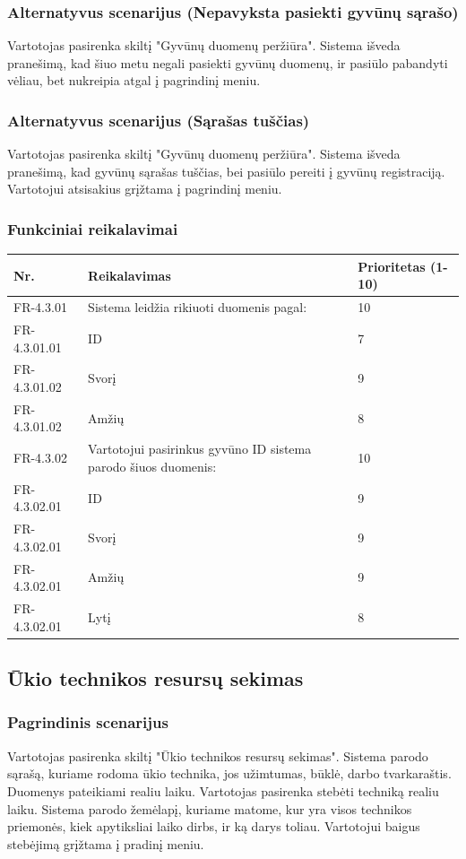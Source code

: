\documentclass[oneside]{VUMIFPSkursinis}
\begin{document}
\subsubsection{Alternatyvus scenarijus (Nepavyksta pasiekti gyvūnų sąrašo)}
	Vartotojas pasirenka skiltį "Gyvūnų duomenų peržiūra". Sistema išveda pranešimą, kad šiuo metu negali pasiekti gyvūnų duomenų, ir pasiūlo pabandyti vėliau, bet nukreipia atgal į pagrindinį meniu.
\subsubsection{Alternatyvus scenarijus (Sąrašas tuščias)}
	Vartotojas pasirenka skiltį "Gyvūnų duomenų peržiūra". Sistema išveda pranešimą, kad gyvūnų sąrašas tuščias, bei pasiūlo pereiti į gyvūnų registraciją. Vartotojui atsisakius grįžtama į pagrindinį meniu.
\subsubsection{Funkciniai reikalavimai}
\begin{table}[htbp]
	\begin{tabularx}{1\textwidth}{ |P{2.5cm}|X|P{3cm }| }  \hline
           	Nr. & Reikalavimas &  Prioritetas (1-10)  \\   \hline 
         	FR-4.3.01 & Sistema leidžia rikiuoti duomenis pagal: & 10  \\   \hline
		FR-4.3.01.01 & ID & 7 \\ \hline
		FR-4.3.01.02 & Svorį & 9 \\ \hline
		FR-4.3.01.02 & Amžių & 8 \\ \hline
        	FR-4.3.02 & Vartotojui pasirinkus gyvūno ID sistema parodo šiuos duomenis: & 10   \\   \hline
		FR-4.3.02.01 & ID & 9 \\ \hline
		FR-4.3.02.01 & Svorį & 9 \\ \hline
		FR-4.3.02.01 & Amžių & 9 \\ \hline
		FR-4.3.02.01 & Lytį & 8 \\ \hline
	\end{tabularx}
\end{table}

\subsection{Ūkio technikos resursų sekimas}
\subsubsection{Pagrindinis scenarijus}
	Vartotojas pasirenka skiltį "Ūkio technikos resursų sekimas". Sistema parodo sąrašą, kuriame rodoma ūkio technika, jos užimtumas, būklė, darbo tvarkaraštis. Duomenys pateikiami realiu laiku. Vartotojas pasirenka stebėti techniką realiu laiku. Sistema parodo žemėlapį, kuriame matome, kur yra visos technikos priemonės, kiek apytiksliai laiko dirbs, ir ką darys toliau. Vartotojui baigus stebėjimą grįžtama į pradinį meniu.
\pagebreak
\end{document}
